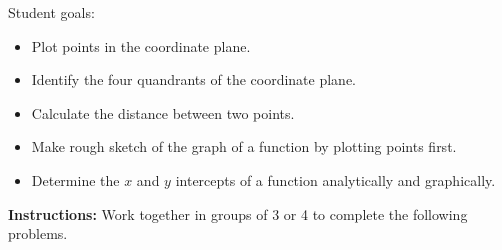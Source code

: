  



\noindent
Student goals:
  \begin{itemize}
  \item Plot points in the coordinate plane.
  \item Identify the four quandrants of the coordinate plane.
  \item Calculate the distance between two points.
  \item Make rough sketch of the graph of a function by plotting
    points first.
  \item Determine the $x$ and $y$ intercepts of a function
    analytically and graphically.
  \end{itemize}


\noindent \textbf{Instructions:}  Work together in groups of  3 or 4 to complete the following problems.


